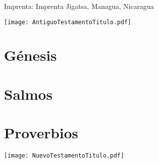 \documentclass[10pt, b5paper, twoside]{extbook}
\begin{document}
\noindent
Imprenta: Imprenta Jigatsa, Managua, Nicaragua\\
\newpage

\titleformat{\section}[hang]{\bfseries\huge}{}{0ex}{}[]

\titleformat{\section}[wrap]{\bfseries\huge}{}{0ex}{}[]

\tableofcontents
\newpage

\null\vfill
\begin{center}
\begin{minipage}[c]{\textwidth}
  \begin{center}
  \texttt{[image: AntiguoTestamentoTitulo.pdf]}
  \end{center}
\end{minipage}
\end{center}
\null\vfill
\newpage

\pagestyle{bible}

\renewcommand{\cleardoublepage}{}
\renewcommand{\clearpage}{}

\chapter{Génesis}
\begin{multicols}{2}
  
\end{multicols}

\chapter{Salmos}
\begin{multicols}{2}
  
\end{multicols}

\chapter{Proverbios}
\begin{multicols}{2}
  
\end{multicols}
\newpage

\pagestyle{empty}

\null\vfill
\begin{center}
\begin{minipage}[c]{\textwidth}
  \begin{center}
  \texttt{[image: NuevoTestamentoTitulo.pdf]}
  \end{center}
\end{minipage}
\end{center}
\null\vfill
\end{document}
